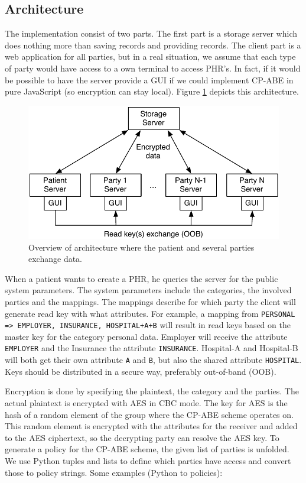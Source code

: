 \documentclass[a4paper]{article}
\begin{document}
	\subsection{Architecture}\label{sec:architecture}
		The implementation consist of two parts. The first part is a storage server which does nothing more than saving records and providing records. The client part is a web application for all parties, but in a real situation, we assume that each type of party would have access to a own terminal to access PHR's. In fact, if it would be possible to have the server provide a GUI if we could implement CP-ABE in pure JavaScript (so encryption can stay local). Figure \ref{fig:architecture} depicts this architecture.
		
		\begin{figure}[H]
	        \centering
            \includegraphics[width=0.75\columnwidth]{figures/architecture.pdf}
	     	\caption{Overview of architecture where the patient and several parties exchange data.}
			\label{fig:architecture}
		\end{figure}
	
		When a patient wants to create a PHR, he queries the server for the public system parameters. The system parameters include the categories, the involved parties and the mappings. The mappings describe for which party the client will generate read key with what attributes. For example, a mapping from \texttt{PERSONAL => EMPLOYER, INSURANCE, HOSPITAL+A+B} will result in read keys based on the master key for the category personal data. Employer will receive the attribute \texttt{EMPLOYER} and the Insurance the attribute \texttt{INSURANCE}. Hospital-A and Hospital-B will both get their own attribute \texttt{A} and \texttt{B}, but also the shared attribute \texttt{HOSPITAL}. Keys should be distributed in a secure way, preferably out-of-band (OOB).
		
		Encryption is done by specifying the plaintext, the category and the parties. The actual plaintext is encrypted with AES in CBC mode. The key for AES is the hash of a random element of the group where the CP-ABE scheme operates on. This random element is encrypted with the attributes for the receiver and added to the AES ciphertext, so the decrypting party can resolve the AES key. To generate a policy for the CP-ABE scheme, the given list of parties is unfolded. We use Python tuples and lists to define which parties have access and convert those to policy strings. Some examples (Python to policies):
		
\end{document}

